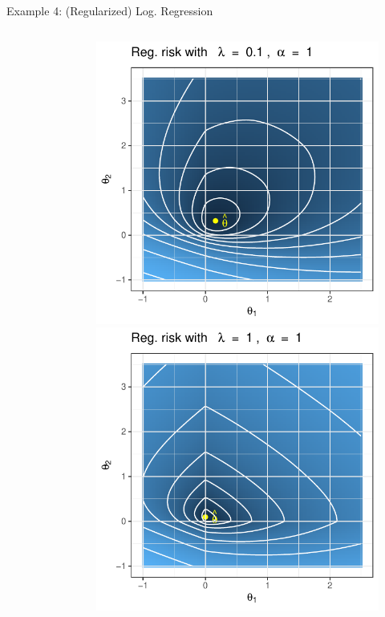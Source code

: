 \documentclass[11pt,compress,t,notes=noshow, xcolor=table]{beamer}
\begin{document}
\begin{vbframe}{Example 4: (Regularized) Log. Regression}
\begin{columns}
\begin{column}{.3\textwidth}
\begin{figure}
\end{figure}
\end{column}
\begin{column}{.3\textwidth}
\begin{figure}
	\includegraphics{figure_man/logreg-1-0.1.pdf}\\
	\includegraphics{figure_man/logreg-1-1.pdf} 
\end{figure}
\end{column}
\end{columns}


\end{vbframe}
\end{document}
